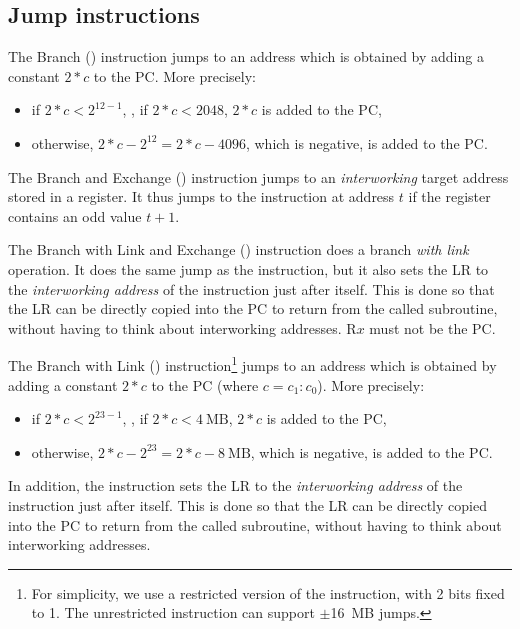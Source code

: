 \subsection{Jump instructions}\label{subsection:jump-insns}

\begin{Paragraph}[]
\end{Paragraph}

The Branch () instruction jumps to an address which is obtained by
adding a constant $2 * c$ to the PC. More precisely:
\begin{itemize}
  \item if $2 * c < 2^{12-1}$, \ie, if $2 * c < 2048$, $2 * c$ is added to the
  PC,

  \item otherwise, $2 * c - 2^{12} = 2 * c - 4096$, which is negative, is added
  to the PC.
\end{itemize}

\begin{Paragraph}
\end{Paragraph}

The Branch and Exchange () instruction jumps to an {\em interworking}
target address stored in a register. It thus jumps to the instruction at
address $t$ if the register contains an odd value $t+1$.

\begin{Paragraph}
\end{Paragraph}

The Branch with Link and Exchange () instruction does a branch {\em
with link} operation. It does the same jump as the  instruction, but it
also sets the LR to the {\em interworking address} of the instruction just
after itself. This is done so that the LR can be directly copied into the PC to
return from the called subroutine, without having to think about
interworking addresses. $\mathrm{R}x$ must not be the PC.

\begin{Paragraph}
\end{Paragraph}

The Branch with Link () instruction\footnote{For simplicity, we use a
restricted version of the  instruction, with 2 bits fixed to 1. The
unrestricted instruction can support $\pm$16~MB jumps.} jumps to an address
which is obtained by adding a constant $2 * c$ to the PC (where $c=c_1{:}c_0$).
More precisely:
\begin{itemize}
  \item if $2 * c < 2^{23-1}$, \ie, if $2 * c < 4\ \mathrm{MB}$, $2 * c$ is
  added to the PC,

  \item otherwise, $2 * c - 2^{23} = 2 * c - 8\ \mathrm{MB}$, which is
  negative, is added to the PC.
\end{itemize}
In addition, the  instruction sets the LR to the {\em interworking
address} of the instruction just after itself. This is done so that the LR can
be directly copied into the PC to return from the called subroutine, without
having to think about interworking addresses.

